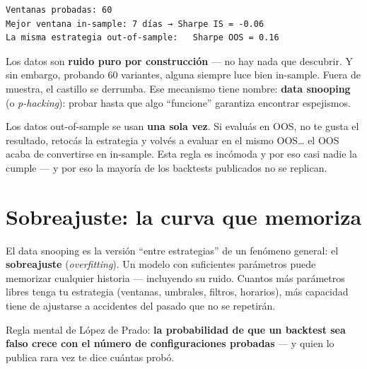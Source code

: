 \documentclass[
  spanish,
  letterpaper,
  DIV=11,
  numbers=noendperiod]{scrreprt}
\begin{document}
\begin{verbatim}
Ventanas probadas: 60
Mejor ventana in-sample: 7 días → Sharpe IS = -0.06
La misma estrategia out-of-sample:   Sharpe OOS = 0.16
\end{verbatim}

Los datos son \textbf{ruido puro por construcción} --- no hay nada que
descubrir. Y sin embargo, probando 60 variantes, alguna siempre luce
bien in-sample. Fuera de muestra, el castillo se derrumba. Ese mecanismo
tiene nombre: \textbf{data snooping} (o \emph{p-hacking}): probar hasta
que algo ``funcione'' garantiza encontrar espejismos.

\begin{tcolorbox}[enhanced jigsaw, bottomrule=.15mm, colback=white, opacitybacktitle=0.6, arc=.35mm, toprule=.15mm, opacityback=0, breakable, titlerule=0mm, left=2mm, coltitle=black, colbacktitle=quarto-callout-warning-color!10!white, colframe=quarto-callout-warning-color-frame, leftrule=.75mm, toptitle=1mm, bottomtitle=1mm, title=\textcolor{quarto-callout-warning-color}{\faExclamationTriangle}\hspace{0.5em}{La regla de oro}, rightrule=.15mm]

Los datos out-of-sample se usan \textbf{una sola vez}. Si evaluás en
OOS, no te gusta el resultado, retocás la estrategia y volvés a evaluar
en el mismo OOS\ldots{} el OOS acaba de convertirse en in-sample. Esta
regla es incómoda y por eso casi nadie la cumple --- y por eso la
mayoría de los backtests publicados no se replican.

\end{tcolorbox}

\section{Sobreajuste: la curva que
memoriza}\label{sobreajuste-la-curva-que-memoriza}

El data snooping es la versión ``entre estrategias'' de un fenómeno
general: el \textbf{sobreajuste} (\emph{overfitting}). Un modelo con
suficientes parámetros puede memorizar cualquier historia --- incluyendo
su ruido. Cuantos más parámetros libres tenga tu estrategia (ventanas,
umbrales, filtros, horarios), más capacidad tiene de ajustarse a
accidentes del pasado que no se repetirán.

Regla mental de López de Prado: \textbf{la probabilidad de que un
backtest sea falso crece con el número de configuraciones probadas} ---
y quien lo publica rara vez te dice cuántas probó.
\end{document}
